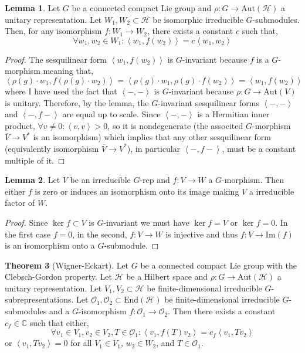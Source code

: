 \documentclass[12pt]{extarticle}
\newcommand{\End}[1]{\mathrm{End}\left(#1\right)}
\renewcommand{\Im}[1]{\mathrm{Im}(#1)}
\theoremstyle{definition}
\newtheorem{theorem}{Theorem}[section]
\newtheorem{lemma}[theorem]{Lemma}
\newcommand{\Aut}[1]{\mathrm{Aut}\left(#1 \right)}
\newcommand{\C}{\mathbb{C}}
\newcommand{\Hil}{\mathcal{H}}
\newcommand{\inner}[2]{\left< #1, #2 \right>}
\begin{document}
\begin{lemma}
Let $G$ be a connected compact Lie group and $\rho : G \to \Aut{\Hil}$ a unitary representation. Let $W_1, W_2 \subset \Hil$ be isomorphic irreducible $G$-submodules. Then, for any isomorphism $f : W_1 \to W_2$, there exists a constant $c$ such that,
\[ \forall w_1, w_2 \in W_1 : \inner{w_1}{f(w_2)} = c \inner{w_1}{w_2} \]
\end{lemma}

\begin{proof}
The sesquilinear form $\inner{w_1}{f(w_2)}$ is $G$-invariant because $f$ is a $G$-morphism meaning that,
\[ \inner{\rho(g) \cdot w_1}{f(\rho(g) \cdot w_2)} = \inner{\rho(g) \cdot w_1}{\rho(g) \cdot f(w_2)} = \inner{w_1}{f(w_2)} \]
where I have used the fact that $\inner{-}{-}$ is $G$-invariant because $\rho : G \to \Aut{V}$ is unitary. Therefore, by the lemma, the $G$-invariant sesquilinear forms $\inner{-}{-}$ and $\inner{-}{f-}$ are equal up to scale. Since $\inner{-}{-}$ is a Hermitian inner product, $\forall v \neq 0 : \inner{v}{v} > 0$, so it is nondegenerate (the associted $G$-morphism $\overline{V} \to V^*$ is an isomorphism) which implies that any other sesquilinear form (equivalently isomorphism $\overline{V} \to V^*$), in particular $\inner{-}{f-}$, must be a constant multiple of it. 
\end{proof}

\begin{lemma}
Let $V$ be an irreducible $G$-rep and $f : V \to W$ a $G$-morphism. Then either $f$ is zero or induces an isomorphism onto its image making $V$ a irreducible factor of $W$.
\end{lemma}

\begin{proof}
Since $\ker{f} \subset V$ is $G$-invariant we must have $\ker{f} = V$ or $\ker{f} = 0$. In the first case $f = 0$, in the second, $f : V \to W$ is injective and thus $f : V \to \Im{f}$ is an isomorphism onto a $G$-submodule.
\end{proof}

\begin{theorem}[Wigner-Eckart]
Let $G$ be a connected compact Lie group with the Clebsch-Gordon property. Let $\Hil$ be a Hilbert space and $\rho : G \to \Aut{\Hil}$ a unitary representation. Let $V_1, V_2 \subset \Hil$ be finite-dimensional irreducible $G$-subrepresentations. Let $\mathcal{O}_1, \mathcal{O}_2 \subset \End{\Hil}$ be finite-dimensional irreducible $G$-submodules and a $G$-isomorphism $f : \mathcal{O}_1 \to \mathcal{O}_2$. Then there exists a constant $c_f \in \C$ such that either,
\[ \forall v_1 \in V_1, v_2 \in V_2, T \in \mathcal{O}_1 : \inner{v_1}{f(T) v_2} = c_f \inner{v_1}{T v_2} \]
or $\inner{v_1}{T v_2} = 0$ for all $V_1 \in V_1$, $w_2 \in W_2$, and $T \in \mathcal{O}_1$. 
\end{theorem}
\end{document}
